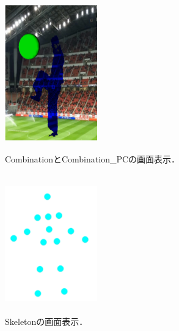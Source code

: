 \begin{figure}[p]
    \begin{minipage}{0.5\hsize}
     \begin{center}
      \includegraphics[width=4cm,height=6cm]{image/Combination.png}
     \end{center}
     \caption[CombinationとCombination\_PCの画面表示]{CombinationとCombination\_PCの画面表示．}
     \label{combination}
    \end{minipage}
    \begin{minipage}{0.5\hsize}
     \begin{center}
      \includegraphics[width=4cm,height=6cm]{image/Skeleton.png}
     \end{center}
     \caption[Skeletonの画面表示]{Skeletonの画面表示．}
     \label{skeleton}
    \end{minipage}
\end{figure}

